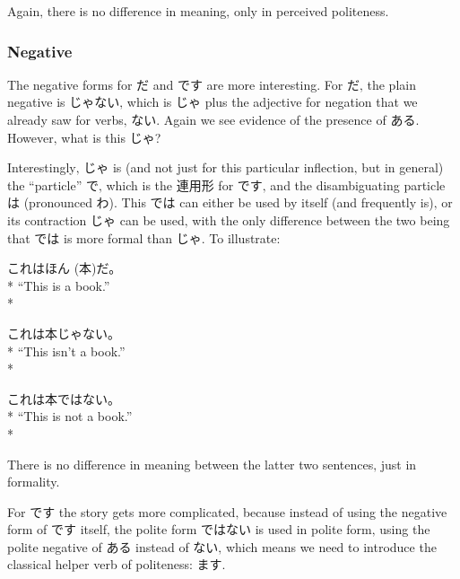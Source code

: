 \documentclass[11pt, b5paper, twoside, openright, onecolumn]{book}
\makeatletter
\newcommand*{\rubystack}[2]{{\relscale{0.5}%
  \begin{tabular}[b]{@{}c@{}}%
    {#1}\\%
   {\textscale{2}{#2}}%
  \end{tabular}}%
}
\DeclareRobustCommand*{\ruby}[2]{%
  \mbox{%
    \setlength{\parskip}{0ex}%
    \BeginAccSupp{method=pdfstringdef,ActualText={#1}}%
      \rubystack{\phantom{#2}}{#1}%
      \llap{%
        \rubystack{#2}{\phantom{#1}}%
      }%
    \EndAccSupp{}%
  }%
}
\renewcommand*{\ruby}[2]{#2 (#1)}%
\newenvironment{exampleblock}{
\setlength{\parindent}{0.6in}
\begin{minipage}[t]{\dimexpr\textwidth-\parindent}}
{\end{minipage}}
\makeatother
\begin{document}
Again‚ there is no difference in meaning‚ only in perceived politeness.
\subsubsection{Negative}

The negative forms for だ and です are more interesting. For だ‚ the plain negative is じゃない‚ which is じゃ plus the adjective for negation that we already saw for verbs‚ ない. Again we see evidence of the presence of ある. However‚ what is this じゃ?

Interestingly‚ じゃ is (and not just for this particular inflection‚ but in general) the “particle” で‚ which is the 連用形 for です‚ and the disambiguating particle は (pronounced わ). This では can either be used by itself (and frequently is)‚ or its contraction じゃ can be used‚ with the only difference between the two being that では is more formal than じゃ. To illustrate:

\vspace{0.4cm}
\begin{exampleblock}
これは\ruby{本}{ほん}だ。 \\* 
“This is a book.” \\* 
\end{exampleblock}
\vspace{0.2cm}

\begin{exampleblock}
これは本じゃない。 \\* 
“This isn’t a book.” \\* 
\end{exampleblock}
\vspace{0.2cm}

\begin{exampleblock}
これは本ではない。 \\* 
“This is not a book.” \\* 
\end{exampleblock}
\vspace{0.2cm}

There is no difference in meaning between the latter two sentences‚ just in formality.

For です the story gets more complicated‚ because instead of using the negative form of です itself‚ the polite form ではない is used in polite form‚ using the polite negative of ある instead of ない‚ which means we need to introduce the classical helper verb of politeness: ます.
\end{document}
